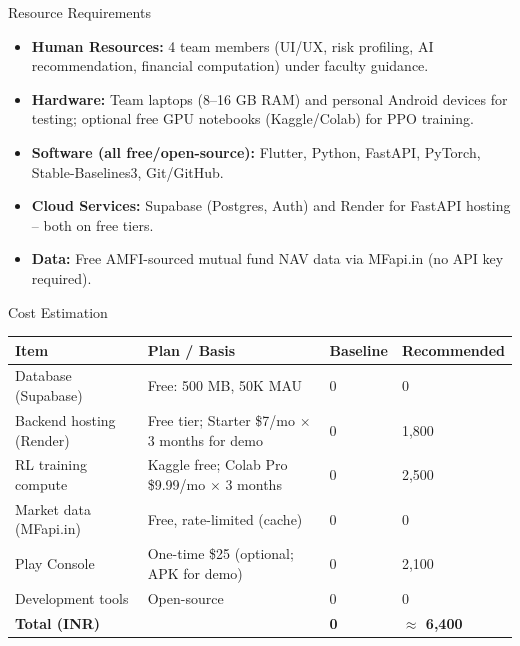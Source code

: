 \documentclass{beamer}
\begin{document}
\begin{frame}{Resource Requirements}
\small
\begin{itemize}
    \item \textbf{Human Resources:} 4 team members (UI/UX, risk profiling, AI recommendation, financial computation) under faculty guidance.
    \item \textbf{Hardware:} Team laptops (8--16 GB RAM) and personal Android devices for testing; optional free GPU notebooks (Kaggle/Colab) for PPO training.
    \item \textbf{Software (all free/open-source):} Flutter, Python, FastAPI, PyTorch, Stable-Baselines3, Git/GitHub.
    \item \textbf{Cloud Services:} Supabase (Postgres, Auth) and Render for FastAPI hosting -- both on free tiers.
    \item \textbf{Data:} Free AMFI-sourced mutual fund NAV data via MFapi.in (no API key required).
\end{itemize}
\end{frame}

\begin{frame}{Cost Estimation}
\tiny
\centering
\begin{tabular}{p{3cm} p{4.2cm} p{1.4cm} p{1.4cm}}
    \toprule
    \textbf{Item} & \textbf{Plan / Basis} & \textbf{Baseline} & \textbf{Recommended} \\
    \midrule
    Database (Supabase) & Free: 500 MB, 50K MAU & 0 & 0 \\
    Backend hosting (Render) & Free tier; Starter \$7/mo $\times$ 3 months for demo & 0 & 1,800 \\
    RL training compute & Kaggle free; Colab Pro \$9.99/mo $\times$ 3 months & 0 & 2,500 \\
    Market data (MFapi.in) & Free, rate-limited (cache) & 0 & 0 \\
    Play Console & One-time \$25 (optional; APK for demo) & 0 & 2,100 \\
    Development tools & Open-source & 0 & 0 \\
    \midrule
    \textbf{Total (INR)} & & \textbf{0} & \textbf{$\approx$ 6,400} \\
    \bottomrule
\end{tabular}
\end{frame}
\end{document}
